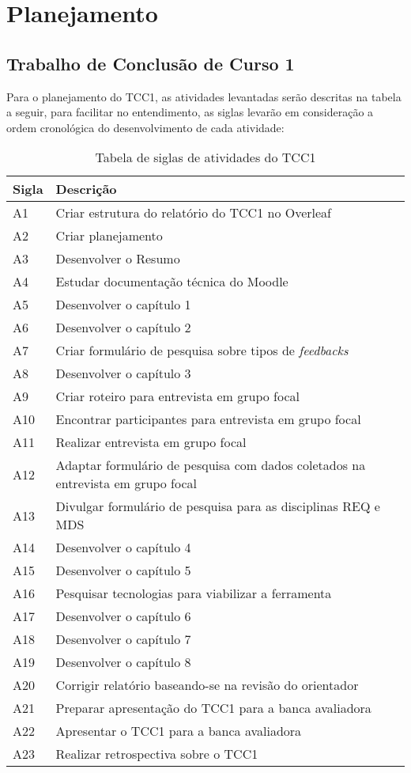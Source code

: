 \chapter{Planejamento}

\section{Trabalho de Conclusão de Curso 1}

Para o planejamento do TCC1, as atividades levantadas serão descritas na tabela a seguir, para facilitar no entendimento, as siglas levarão em consideração a ordem cronológica do desenvolvimento de cada atividade:

\begin{table}[!ht]
\centering
\begin{tabularx}{\textwidth}{|X|X|}
\hline
\textbf{Sigla} & \textbf{Descrição} \\
\hline
A1 & Criar estrutura do relatório do TCC1 no Overleaf \\ \hline
A2 & Criar planejamento  \\\hline
A3 & Desenvolver o Resumo \\\hline
A4 & Estudar documentação técnica do Moodle \\\hline
A5 & Desenvolver o capítulo 1 \\\hline
A6 & Desenvolver o capítulo 2 \\\hline
A7 & Criar formulário de pesquisa sobre tipos de \textit{feedbacks} \\\hline
A8 & Desenvolver o capítulo 3 \\\hline
A9 & Criar roteiro para entrevista em grupo focal \\\hline
A10 & Encontrar participantes para entrevista em grupo focal \\\hline
A11 & Realizar entrevista em grupo focal \\\hline
A12 & Adaptar formulário de pesquisa com dados coletados na entrevista em grupo focal \\\hline
A13 & Divulgar formulário de pesquisa para as disciplinas REQ e MDS \\\hline
A14 & Desenvolver o capítulo 4 \\\hline
A15 & Desenvolver o capítulo 5 \\\hline
A16 & Pesquisar tecnologias para viabilizar a ferramenta \\\hline
A17 & Desenvolver o capítulo 6 \\\hline
A18 & Desenvolver o capítulo 7 \\\hline
A19 & Desenvolver o capítulo 8 \\\hline
A20 & Corrigir relatório baseando-se na revisão do orientador \\\hline
A21 & Preparar apresentação do TCC1 para a banca avaliadora \\\hline
A22 & Apresentar o TCC1 para a banca avaliadora \\\hline
A23 & Realizar retrospectiva sobre o TCC1 \\\hline
\end{tabularx}
\caption{Tabela de siglas de atividades do TCC1}
\end{table}

